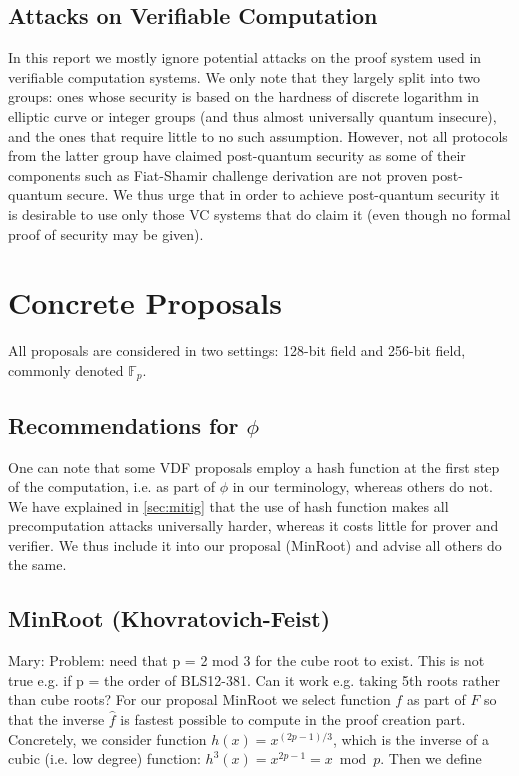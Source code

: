 \documentclass{article}
\newcommand{\mary}[1]{ {\color{magenta} Mary:  #1 }}
\begin{document}
\subsection{Attacks on Verifiable Computation}

In this report we mostly ignore potential attacks on the proof system used in verifiable computation systems. We only note that they largely split into two groups: ones whose security is based on the hardness of discrete logarithm in elliptic curve or integer groups (and thus almost universally quantum insecure), and the ones that require little to no such assumption. However, not all protocols from the latter group have claimed post-quantum security as some of their components such as Fiat-Shamir challenge derivation are not proven post-quantum secure. We thus urge that in order to achieve post-quantum security it is desirable to use only those VC systems that do claim it (even though no formal proof of security may be given).


\section{Concrete Proposals}\label{sec:proposal}

All proposals are considered in two settings: 128-bit field and 256-bit field, commonly denoted $\mathbb{F}_p$.

\subsection{Recommendations for $\phi$}

One can note that some VDF proposals employ a hash function at the first step of the computation, i.e. as part of $\phi$ in our terminology, whereas others do not. We have explained in \cref{sec:mitig} that the use of hash function makes all precomputation attacks universally harder, whereas it costs little for prover and verifier. We thus include it into our proposal (MinRoot) and advise all others do the same.

\subsection{MinRoot  (Khovratovich-Feist)}

\mary{Problem: need that p = 2 mod 3 for the cube root to exist.  This is not true e.g. if p = the order of BLS12-381.
Can it work e.g. taking 5th roots rather than cube roots?
}
For our proposal MinRoot we select function $f$ as part of $F$ so that the inverse $\widehat{f}$ is fastest possible to compute in the proof creation part. Concretely, we consider function $h(x) = x^{(2p-1)/3}$, which is the inverse of a cubic (i.e. low degree) function: $h^3(x) = x^{2p-1} = x\bmod{p}$. Then we define
\end{document}
